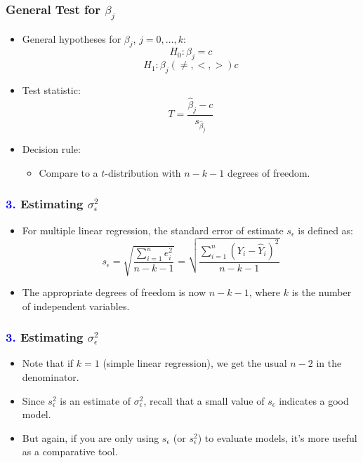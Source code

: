 \documentclass[14pt]{beamer}
\begin{document}
\begin{frame}
	\frametitle{General Test for $\beta_j$}
	
	\begin{itemize}[label={\color{blue}$\blacktriangleright$}]
		\item General hypotheses for $\beta_j$, $j=0,\ldots,k$:
		\[
		H_0 : \beta_j = c
		\]
		\[
		H_1 : \beta_j(\neq,<,>)c
		\]
		
		\item Test statistic:
		\[
		T = \frac{\hat{\beta}_j - c}{s_{\hat{\beta}_j}}
		\]
		
		\item Decision rule:
		\begin{itemize}[label={\color{blue}$\blacktriangleright$}]
			\item Compare to a $t$-distribution with $n-k-1$ degrees of freedom.
		\end{itemize}
	\end{itemize}
	
\end{frame}
\begin{frame}
	\frametitle{\textcolor{blue}{3.} Estimating $\sigma_\epsilon^2$}
	
	\begin{itemize}[label={\color{blue}$\blacktriangleright$}]
		\item For multiple linear regression, the standard error of estimate $s_\epsilon$ is defined as:
		\[
		s_\epsilon = \sqrt{\frac{\sum_{i=1}^n e_i^2}{n-k-1}} = \sqrt{\frac{\sum_{i=1}^n (Y_i - \hat{Y}_i)^2}{n-k-1}}
		\]
		
		\item The appropriate degrees of freedom is now $n-k-1$, where $k$ is the number of independent variables.
	\end{itemize}
	
\end{frame}
\begin{frame}
	\frametitle{\textcolor{blue}{3.} Estimating $\sigma_\epsilon^2$}
	
	\begin{itemize}[label={\color{blue}$\blacktriangleright$}]
		\item Note that if $k=1$ (simple linear regression), we get the usual $n-2$ in the denominator.
		
		\item Since $s_\epsilon^2$ is an estimate of $\sigma_\epsilon^2$, recall that a small value of $s_\epsilon$ indicates a good model.
		
		\item But again, if you are only using $s_\epsilon$ (or $s_\epsilon^2$) to evaluate models, it's more useful as a comparative tool.
	\end{itemize}
	
\end{frame}
\end{document}
